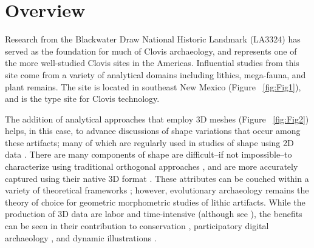 \documentclass[preprint,12pt]{elsarticle}
\begin{document}
\linenumbers

\section{Overview} %

Research from the Blackwater Draw National Historic Landmark (LA3324) has served as the foundation for much of Clovis archaeology, and represents one of the more well-studied Clovis sites in the Americas. Influential studies from this site come from a variety of analytical domains including lithics, mega-fauna, and plant remains. The site is located in southeast New Mexico (Figure ~\ref{fig:Fig1}), and is the type site for Clovis technology.

The addition of analytical approaches that employ 3D meshes (Figure ~\ref{fig:Fig2}) helps, in this case, to advance discussions of shape variations that occur among these artifacts; many of which are regularly used in studies of shape using 2D data \cite{RN256, RN258, RN4570, RN1812, RN4589}. There are many components of shape are difficult--if not impossible--to characterize using traditional orthogonal approaches \cite{Shott:1, Shott:2}, and are more accurately captured using their native 3D format \cite{RN4546, RN4561}. These attributes can be couched within a variety of theoretical frameworks \cite{Hosfield:1, Costin:1, Costin:2}; however, evolutionary archaeology remains the theory of choice for geometric morphometric studies of lithic artifacts. While the production of 3D data are labor and time-intensive (although see \cite{Ahmed:1}), the benefits can be seen in their contribution to conservation \cite{Kuzminsky:1}, participatory digital archaeology \cite{Morgan:1}, and dynamic illustrations \cite{Magnani:1, Carlson:1}. 
\end{document}
